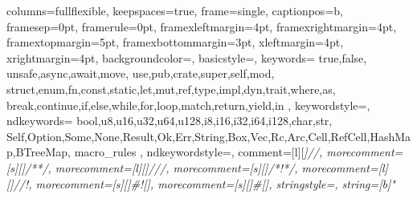 \usepackage[utf8]{inputenc}

\usepackage{algorithmic, algorithm}

\usepackage{csquotes}
\usepackage{booktabs}
\usepackage{multirow}

\usepackage{makecell}
\usepackage[table,xcdraw]{xcolor}

\usepackage{fdsymbol}

\usepackage{graphicx}

\usepackage{siunitx}

\usepackage{tikz}
\usetikzlibrary{
    shapes.geometric, arrows, positioning, decorations.pathreplacing,
    patterns
}
\usepackage{pgfplots}


\usepackage{color}
\usepackage{listings}

{
    columns=fullflexible,
    keepspaces=true,
    frame=single,
    captionpos=b, %
    framesep=0pt,
    framerule=0pt,
    framexleftmargin=4pt,
    framexrightmargin=4pt,
    framextopmargin=5pt,
    framexbottommargin=3pt,
    xleftmargin=4pt,
    xrightmargin=4pt,
    backgroundcolor=\color{GrayCodeBlock},
    basicstyle=\ttfamily\color{BlackText},
    keywords={
        true,false,
        unsafe,async,await,move,
        use,pub,crate,super,self,mod,
        struct,enum,fn,const,static,let,mut,ref,type,impl,dyn,trait,where,as,
        break,continue,if,else,while,for,loop,match,return,yield,in
    },
    keywordstyle=\color{PurpleKeyword},
    ndkeywords={
        bool,u8,u16,u32,u64,u128,i8,i16,i32,i64,i128,char,str,
        Self,Option,Some,None,Result,Ok,Err,String,Box,Vec,Rc,Arc,Cell,RefCell,HashMap,BTreeMap,
        macro_rules
    },
    ndkeywordstyle=\color{RedTypename},
    comment=[l][\color{GrayComment}\slshape]{//},
    morecomment=[s][\color{GrayComment}\slshape]{/*}{*/},
    morecomment=[l][\color{GoldDocumentation}\slshape]{///},
    morecomment=[s][\color{GoldDocumentation}\slshape]{/*!}{*/},
    morecomment=[l][\color{GoldDocumentation}\slshape]{//!},
    morecomment=[s][\color{RedTypename}]{\#![}{]},
    morecomment=[s][\color{RedTypename}]{\#[}{]},
    stringstyle=\color{GreenString},
    string=[b]"
}
